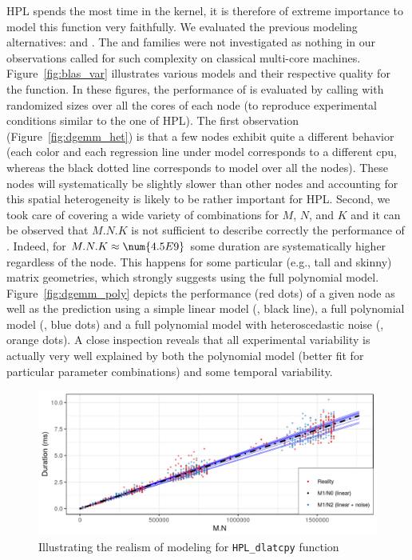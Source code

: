             HPL spends the most time in the \dgemm kernel, it is therefore of extreme importance to model this
            function very faithfully.  We  evaluated the previous modeling alternatives:
             and .  The \modelp{} and \noisep{}
            families were not investigated as nothing in our observations called for such complexity on classical
            multi-core machines.  Figure~\ref{fig:blas_var} illustrates various models and their respective quality for
            the \dgemm function. In these figures, the performance of \dgemm is evaluated by calling
            \dgemm with randomized sizes over all the cores of each node (to reproduce experimental conditions
            similar to the one of HPL). The first observation (Figure~\ref{fig:dgemm_het}) is that a few nodes exhibit
            quite a different behavior (each color and each regression line under model  corresponds to a
            different cpu, whereas the black dotted line corresponds to model  over all the nodes). These nodes
            will systematically be slightly slower than other nodes and accounting for this spatial heterogeneity is
            likely to be rather important for HPL.  Second, we took care of covering a wide variety of combinations for
            \(M\), \(N\), and \(K\) and it can be observed that \(M.N.K\) is not sufficient to describe correctly the
            performance of \dgemm. Indeed, for \(M.N.K \approx \num{4.5E9}\) some duration are systematically
            higher regardless of the node. This happens for some particular (e.g., tall and skinny) matrix geometries,
            which strongly suggests using the full polynomial model. Figure~\ref{fig:dgemm_poly} depicts the performance
            (red dots) of a given node as well as the prediction using a simple linear model (, black line),
            a full polynomial model (, blue dots) and a full polynomial model with heteroscedastic noise
            (, orange dots). A close inspection reveals that all experimental variability is
            actually very well explained by both the polynomial model (better fit for particular parameter combinations)
            and some temporal variability.

            \begin{figure}[htpb]
                \centering
                \includegraphics[width=\linewidth]{img/prediction/modeling/kernels/dlatcpy_model.png}
                \caption{Illustrating the realism of modeling for \texttt{HPL\_dlatcpy} function}
                \label{fig:HPL_var}
            \end{figure}

